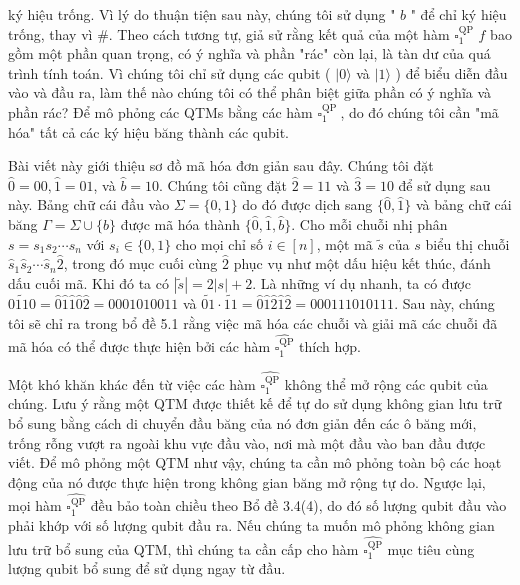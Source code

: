 \documentclass[10pt]{article}
\begin{document}
ký hiệu trống. Vì lý do thuận tiện sau này, chúng tôi sử dụng " $b$ " để chỉ ký hiệu trống, thay vì $\#$. Theo cách tương tự, giả sử rằng kết quả của một hàm $\square_{1}^{\mathrm{QP}}$ $f$ bao gồm một phần quan trọng, có ý nghĩa và phần "rác" còn lại, là tàn dư của quá trình tính toán. Vì chúng tôi chỉ sử dụng các qubit ( $|0\rangle$ và $|1\rangle$ ) để biểu diễn đầu vào và đầu ra, làm thế nào chúng tôi có thể phân biệt giữa phần có ý nghĩa và phần rác? Để mô phỏng các QTMs bằng các hàm $\square_{1}^{\text {QP }}$, do đó chúng tôi cần "mã hóa" tất cả các ký hiệu băng thành các qubit.

Bài viết này giới thiệu sơ đồ mã hóa đơn giản sau đây. Chúng tôi đặt $\hat{0}=00, \hat{1}=01$, và $\hat{b}=10$. Chúng tôi cũng đặt $\hat{2}=11$ và $\hat{3}=10$ để sử dụng sau này. Bảng chữ cái đầu vào $\Sigma=\{0,1\}$ do đó được dịch sang $\{\hat{0}, \hat{1}\}$ và bảng chữ cái băng $\Gamma=\Sigma \cup\{b\}$ được mã hóa thành $\{\hat{0}, \hat{1}, \hat{b}\}$. Cho mỗi chuỗi nhị phân $s=s_{1} s_{2} \cdots s_{n}$ với $s_{i} \in\{0,1\}$ cho mọi chỉ số $i \in[n]$, một mã $\tilde{s}$ của $s$ biểu thị chuỗi $\hat{s}_{1} \hat{s}_{2} \cdots \hat{s}_{n} \hat{2}$, trong đó mục cuối cùng $\hat{2}$ phục vụ như một dấu hiệu kết thúc, đánh dấu cuối mã. Khi đó ta có $|\tilde{s}|=2|s|+2$. Là những ví dụ nhanh, ta có được $\widetilde{0110}=\hat{0} \hat{1} \hat{1} \hat{0} \hat{2}=0001010011$ và $\widetilde{01} \cdot \widetilde{11}=\hat{0} \hat{1} \hat{2} \hat{1} \hat{2}=000111010111$. Sau này, chúng tôi sẽ chỉ ra trong bổ đề 5.1 rằng việc mã hóa các chuỗi và giải mã các chuỗi đã mã hóa có thể được thực hiện bởi các hàm $\widehat{\square_{1}^{\mathrm{QP}}}$ thích hợp.

Một khó khăn khác đến từ việc các hàm $\widehat{\square_{1}^{\mathrm{QP}}}$ không thể mở rộng các qubit của chúng. Lưu ý rằng một QTM được thiết kế để tự do sử dụng không gian lưu trữ bổ sung bằng cách di chuyển đầu băng của nó đơn giản đến các ô băng mới, trống rỗng vượt ra ngoài khu vực đầu vào, nơi mà một đầu vào ban đầu được viết. Để mô phỏng một QTM như vậy, chúng ta cần mô phỏng toàn bộ các hoạt động của nó được thực hiện trong không gian băng mở rộng tự do. Ngược lại, mọi hàm $\widehat{\square_{1}^{\mathrm{QP}}}$ đều bảo toàn chiều theo Bổ đề 3.4(4), do đó số lượng qubit đầu vào phải khớp với số lượng qubit đầu ra. Nếu chúng ta muốn mô phỏng không gian lưu trữ bổ sung của QTM, thì chúng ta cần cấp cho hàm $\widehat{\square_{1}^{\mathrm{QP}}}$ mục tiêu cùng lượng qubit bổ sung để sử dụng ngay từ đầu.
\end{document}
